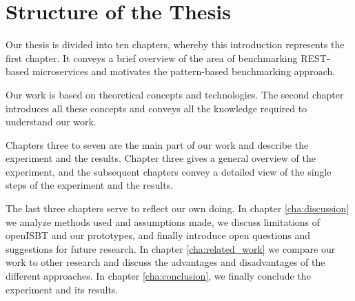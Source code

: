 \section{Structure of the Thesis}
\label{sec:structure}

Our thesis is divided into ten chapters, whereby this introduction represents the first chapter. It conveys a brief overview of the area of benchmarking REST-based microservices and motivates the pattern-based benchmarking approach.

Our work is based on theoretical concepts and technologies. The second chapter introduces all these concepts and conveys all the knowledge required to understand our work.

Chapters three to seven are the main part of our work and describe the experiment and the results. Chapter three gives a general overview of the experiment, and the subsequent chapters convey a detailed view of the single steps of the experiment and the results.

The last three chapters serve to reflect our own doing. In chapter \ref{cha:discussion} we analyze methods used and assumptions made, we discuss limitations of openISBT and our prototypes, and finally introduce open questions and suggestions for future research. In chapter \ref{cha:related_work} we compare our work to other research and discuss the advantages and disadvantages of the different approaches. In chapter \ref{cha:conclusion}, we finally conclude the experiment and its results.